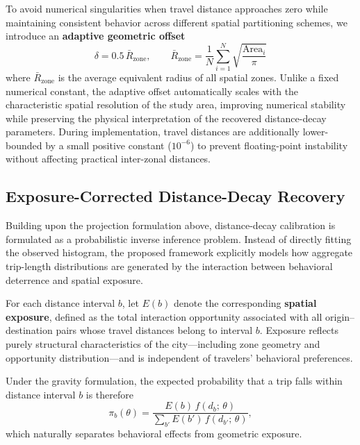 To avoid numerical singularities when travel distance approaches zero while maintaining consistent behavior across different spatial partitioning schemes, we introduce an \textbf{adaptive geometric offset}
\begin{equation}\label{eq:delta}
\delta = 0.5\,\bar{R}_{\mathrm{zone}}, \qquad \bar{R}_{\mathrm{zone}} = \frac{1}{N} \sum_{i=1}^{N} \sqrt{\frac{\mathrm{Area}_i}{\pi}}
\end{equation}
where $\bar{R}_{\mathrm{zone}}$ is the average equivalent radius of all spatial zones. Unlike a fixed numerical constant, the adaptive offset automatically scales with the characteristic spatial resolution of the study area, improving numerical stability while preserving the physical interpretation of the recovered distance-decay parameters. During implementation, travel distances are additionally lower-bounded by a small positive constant ($10^{-6}$) to prevent floating-point instability without affecting practical inter-zonal distances.

\subsection{Exposure-Corrected Distance-Decay Recovery}\label{sec:aggregate_calibration}

Building upon the projection formulation above, distance-decay calibration is formulated as a probabilistic inverse inference problem. Instead of directly fitting the observed histogram, the proposed framework explicitly models how aggregate trip-length distributions are generated by the interaction between behavioral deterrence and spatial exposure.

For each distance interval $b$, let $E(b)$ denote the corresponding \textbf{spatial exposure}, defined as the total interaction opportunity associated with all origin--destination pairs whose travel distances belong to interval $b$. Exposure reflects purely structural characteristics of the city---including zone geometry and opportunity distribution---and is independent of travelers' behavioral preferences.

Under the gravity formulation, the expected probability that a trip falls within distance interval $b$ is therefore
\begin{equation}\label{eq:predicted_prob_mle}
\pi_b(\theta) = \frac{E(b)\, f(d_b;\,\theta)}{\sum_{b'} E(b')\, f(d_{b'};\,\theta)},
\end{equation}
which naturally separates behavioral effects from geometric exposure.

